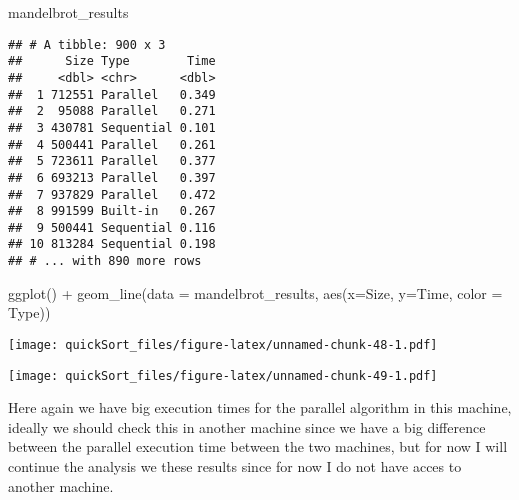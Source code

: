 \documentclass[
]{article}
\newenvironment{Shaded}{\begin{snugshade}}{\end{snugshade}}
\newcommand{\AttributeTok}[1]{\textcolor[rgb]{0.77,0.63,0.00}{#1}}
\newcommand{\FunctionTok}[1]{\textcolor[rgb]{0.00,0.00,0.00}{#1}}
\newcommand{\NormalTok}[1]{#1}
\newcommand{\OtherTok}[1]{\textcolor[rgb]{0.56,0.35,0.01}{#1}}
\newcommand{\SpecialCharTok}[1]{\textcolor[rgb]{0.00,0.00,0.00}{#1}}
\begin{document}
\begin{Shaded}
\begin{Highlighting}[]
\NormalTok{mandelbrot\_results}
\end{Highlighting}
\end{Shaded}

\begin{verbatim}
## # A tibble: 900 x 3
##      Size Type        Time
##     <dbl> <chr>      <dbl>
##  1 712551 Parallel   0.349
##  2  95088 Parallel   0.271
##  3 430781 Sequential 0.101
##  4 500441 Parallel   0.261
##  5 723611 Parallel   0.377
##  6 693213 Parallel   0.397
##  7 937829 Parallel   0.472
##  8 991599 Built-in   0.267
##  9 500441 Sequential 0.116
## 10 813284 Sequential 0.198
## # ... with 890 more rows
\end{verbatim}

\begin{Shaded}
\begin{Highlighting}[]
\FunctionTok{ggplot}\NormalTok{() }\SpecialCharTok{+}               
  \FunctionTok{geom\_line}\NormalTok{(}\AttributeTok{data =}\NormalTok{ mandelbrot\_results, }\FunctionTok{aes}\NormalTok{(}\AttributeTok{x=}\NormalTok{Size, }\AttributeTok{y=}\NormalTok{Time, }\AttributeTok{color =}\NormalTok{ Type))}
\end{Highlighting}
\end{Shaded}

\texttt{[image: quickSort\_files/figure-latex/unnamed-chunk-48-1.pdf]}

\begin{Shaded}
\end{Shaded}

\texttt{[image: quickSort\_files/figure-latex/unnamed-chunk-49-1.pdf]}

Here again we have big execution times for the parallel algorithm in
this machine, ideally we should check this in another machine since we
have a big difference between the parallel execution time between the
two machines, but for now I will continue the analysis we these results
since for now I do not have acces to another machine.
\end{document}
